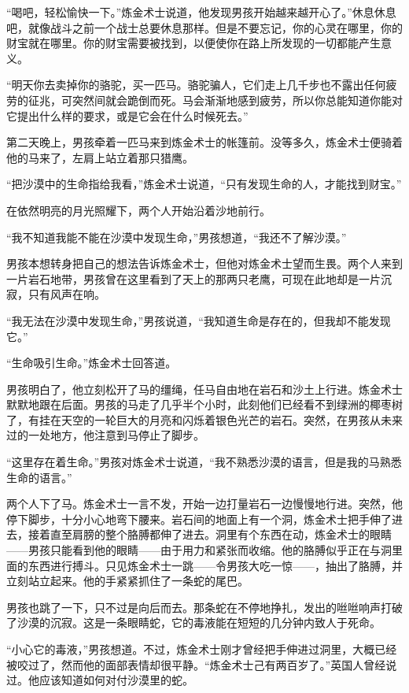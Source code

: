 \documentclass[twoside,openany]{book}
\begin{document}
“喝吧，轻松愉快一下。”炼金术士说道，他发现男孩开始越来越开心了。”休息休息吧，就像战斗之前一个战士总要休息那样。但是不要忘记，你的心灵在哪里，你的财宝就在哪里。你的财宝需要被找到，以便使你在路上所发现的一切都能产生意义。

“明天你去卖掉你的骆驼，买一匹马。骆驼骗人，它们走上几千步也不露出任何疲劳的征兆，可突然间就会跪倒而死。马会渐渐地感到疲劳，所以你总能知道你能对它提出什么样的要求，或是它会在什么时候死去。”

第二天晚上，男孩牵着一匹马来到炼金术士的帐篷前。没等多久，炼金术士便骑着他的马来了，左肩上站立着那只猎鹰。

“把沙漠中的生命指给我看，”炼金术士说道，“只有发现生命的人，才能找到财宝。”

在依然明亮的月光照耀下，两个人开始沿着沙地前行。

“我不知道我能不能在沙漠中发现生命，”男孩想道，“我还不了解沙漠。”

男孩本想转身把自己的想法告诉炼金术士，但他对炼金术士望而生畏。两个人来到一片岩石地带，男孩曾在这里看到了天上的那两只老鹰，可现在此地却是一片沉寂，只有风声在响。

“我无法在沙漠中发现生命，”男孩说道，“我知道生命是存在的，但我却不能发现它。”

“生命吸引生命。”炼金术士回答道。

男孩明白了，他立刻松开了马的缰绳，任马自由地在岩石和沙土上行进。炼金术士默默地跟在后面。男孩的马走了几乎半个小时，此刻他们已经看不到绿洲的椰枣树了，有挂在天空的一轮巨大的月亮和闪烁着银色光芒的岩石。突然，在男孩从未来过的一处地方，他注意到马停止了脚步。

“这里存在着生命。”男孩对炼金术士说道，“我不熟悉沙漠的语言，但是我的马熟悉生命的语言。”

两个人下了马。炼金术士一言不发，开始一边打量岩石一边慢慢地行进。突然，他停下脚步，十分小心地弯下腰来。岩石间的地面上有一个洞，炼金术士把手伸了进去，接着直至肩膀的整个胳膊都伸了进去。洞里有个东西在动，炼金术士的眼睛——男孩只能看到他的眼睛——由于用力和紧张而收缩。他的胳膊似乎正在与洞里面的东西进行搏斗。只见炼金术士一跳——令男孩大吃一惊——，抽出了胳膊，并立刻站立起来。他的手紧紧抓住了一条蛇的尾巴。

男孩也跳了一下，只不过是向后而去。那条蛇在不停地挣扎，发出的咝咝响声打破了沙漠的沉寂。这是一条眼睛蛇，它的毒液能在短短的几分钟内致人于死命。

“小心它的毒液，”男孩想道。不过，炼金术士刚才曾经把手伸进过洞里，大概已经被咬过了，然而他的面部表情却很平静。“炼金术士己有两百岁了。”英国人曾经说过。他应该知道如何对付沙漠里的蛇。
\end{document}
